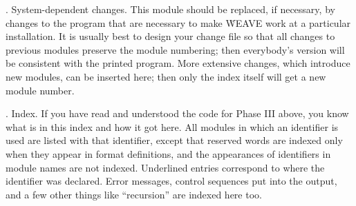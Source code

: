 .  System-dependent changes.
This module should be replaced, if necessary, by changes to the program
that are necessary to make \.{WEAVE} work at a particular installation.
It is usually best to design your change file so that all changes to
previous modules preserve the module numbering; then everybody's version
will be consistent with the printed program. More extensive changes,
which introduce new modules, can be inserted here; then only the index
itself will get a new module number.

\fi

.  Index.
If you have read and understood the code for Phase III above, you know what
is in this index and how it got here. All modules in which an identifier is
used are listed with that identifier, except that reserved words are
indexed only when they appear in format definitions, and the appearances
of identifiers in module names are not indexed. Underlined entries
correspond to where the identifier was declared. Error messages, control
sequences put into the output, and a few
other things like ``recursion'' are indexed here too.
\fi


